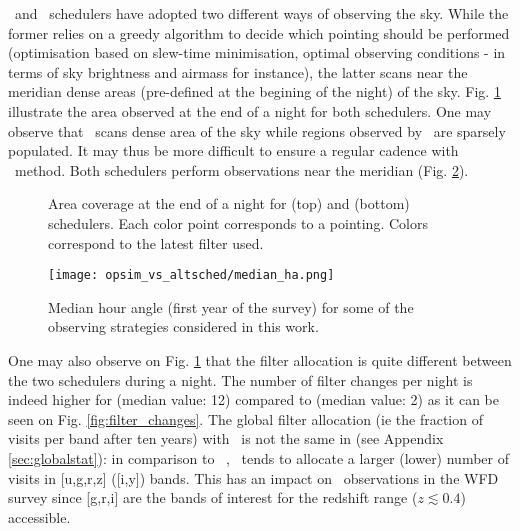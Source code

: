 \opsim~and \altsched~schedulers have adopted two different ways of observing the sky. While the former relies on a greedy algorithm to decide which pointing should be performed (optimisation based on slew-time minimisation, optimal observing conditions - in terms of sky brightness and airmass for instance), the latter scans near the meridian dense areas (pre-defined at the begining of the night) of the sky. Fig. \ref{fig:night_comp} illustrate the area observed at the end of a night for both schedulers. One may observe that \altsched~scans dense area of the sky while regions observed by \opsim~are sparsely populated. It may thus be more difficult to ensure a regular cadence with \opsim~method. Both schedulers perform observations near the meridian (Fig. \ref{fig:scan_meridian}).

\begin{figure}[!htbp]
  \centering
  \caption{Area coverage at the end of a night for \opsim(top) and \altsched(bottom) schedulers.  Each color point corresponds to a pointing. Colors correspond to the latest filter used.}\label{fig:night_comp}
\end{figure}

\begin{figure}[!htbp]
  \begin{center}
    \texttt{[image: opsim\_vs\_altsched/median\_ha.png]}
    \caption{Median hour angle (first year of the survey) for some of the observing strategies considered in this work.}\label{fig:scan_meridian}
    \end{center}
\end{figure}

One may also observe on Fig. \ref{fig:night_comp} that the filter allocation is quite different between the two schedulers during a night. The number of filter changes per night is indeed higher for \altsched(median value: 12) compared to \opsim(median value: 2) as it can be seen on Fig. \ref{fig:filter_changes}. The global filter allocation (ie the fraction of visits per band after ten years) with \altsched~is not the same in \opsim (see Appendix \ref{sec:globalstat}): in comparison to \opsim~, \altsched~tends to allocate a larger (lower)  number of visits in [u,g,r,z] ([i,y]) bands. This has an impact on \sne~observations in the WFD survey since [g,r,i] are the bands of interest for the redshift range ($z \lesssim 0.4$) accessible.

